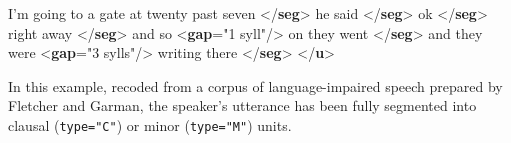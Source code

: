 \begin{shaded}
I'm going to a gate\mbox{}\newline 
\hspace*{1em}\hspace*{1em} at twenty past seven {</\textbf{seg}>}\mbox{}\newline 
{}he said {</\textbf{seg}>}\mbox{}\newline 
{}ok {</\textbf{seg}>}\mbox{}\newline 
{}right away {</\textbf{seg}>}\mbox{}\newline 
{}and so {<\textbf{gap}\hspace*{1em}{extent}="{1 syll}"/>} on they went {</\textbf{seg}>}\mbox{}\newline 
{}and they were {<\textbf{gap}\hspace*{1em}{extent}="{3 sylls}"/>}\mbox{}\newline 
\hspace*{1em}\hspace*{1em} writing there {</\textbf{seg}>}\mbox{}\newline 
{</\textbf{u}>}\end{shaded}\egroup\par \noindent   In this example, recoded from a corpus of language-impaired speech prepared by Fletcher and Garman, the speaker's utterance has been fully segmented into clausal (\texttt{type="C"}) or minor (\texttt{type="M"}) units.\par
